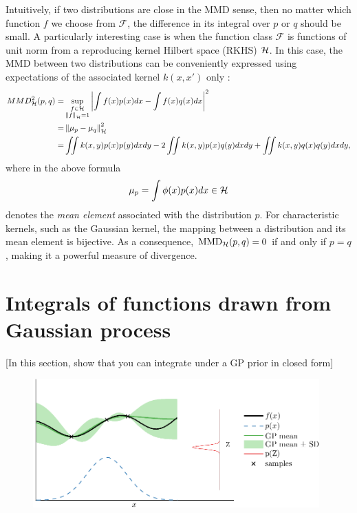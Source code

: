 \documentclass{article} %
\begin{document}
Intuitively, if two distributions are close in the MMD sense, then no matter which function $f$ we choose from $\mathcal{F}$, the difference in its integral over $p$ or $q$ should be small. A particularly interesting case is when the function class $\mathcal{F}$ is functions of unit norm from a reproducing kernel Hilbert space (RKHS) $\mathcal{H}$. In this case, the MMD between two distributions can be conveniently expressed using expectations of the associated kernel $k(x, x')$ only \citep{Sriperumbudur2010}:
%
\begin{align}
MMD^2_{\mathcal{H}}(p,q) =& \sup_{\substack{f\in\mathcal{H}\\\left\|f\right\|_{\mathcal{H}}=1}}\left\vert\int f(x) p(x) dx - \int f(x) q(x) dx\right\vert^2\label{eqn:rkhs-mmd}\\
	= & \left\|\mu_{p} - \mu_{q}\right\|_{\mathcal{H}}^2\\
	= & \iint k(x,y) p(x) p(y) dx dy - 2 \iint k(x,y) p(x) q(y) dx dy + \iint k(x,y) q(x) q(y) dx dy,
\end{align}
%
where in the above formula 
%
\begin{align}
\mu_{p}=\int \phi({x})p({x})d{x}\in\mathcal{H}
\end{align}
%
denotes the \emph{mean element} associated with the distribution $p$. For characteristic kernels, such as the Gaussian kernel, the mapping between a distribution and its mean element is bijective. As a consequence, ${\rm MMD}_{\mathcal{H}}(p,q)=0$ if and only if $p=q$, making it a powerful measure of divergence.



\section{Integrals of functions drawn from Gaussian process}

[In this section, show that you can integrate under a GP prior in closed form]

\begin{figure}[h!]
\centering
\includegraphics[width=11cm]{figures/bq_buildup/buildup_samps3}
\end{figure}
\end{document}
